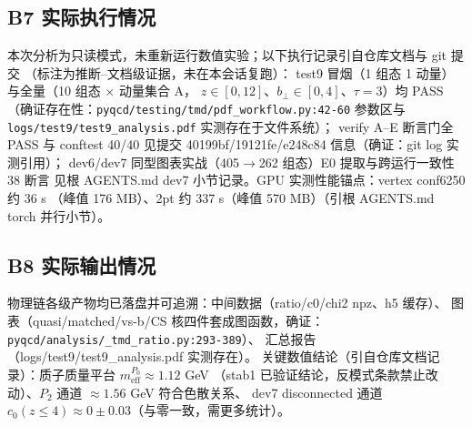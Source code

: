 \documentclass[UTF8]{ctexart}
\begin{document}
\subsection{B7 实际执行情况}
本次分析为只读模式，未重新运行数值实验；以下执行记录引自仓库文档与 git 提交
（标注为\textcolor{relation}{推断--文档级证据}，未在本会话复跑）：
test9 冒烟（1 组态 1 动量）与全量（10 组态 $\times$ 动量集合 A，
$z\in[0,12]$、$b_\perp\in[0,4]$、$\tau=3$）均 PASS
（确证存在性：\texttt{\nolinkurl{pyqcd/testing/tmd/pdf_workflow.py:42-60}}
参数区与 \texttt{logs/test9/test9\_analysis.pdf} 实测存在于文件系统）；
verify A--E 断言门全 PASS 与 conftest 40/40 见提交 40199bf/19121fe/e248c84
信息（确证：git log 实测引用）；
dev6/dev7 同型图表实战（405$\to$262 组态）E0 提取与跨运行一致性 38 断言
见根 AGENTS.md dev7 小节记录。GPU 实测性能锚点：vertex conf6250 约 36 s
（峰值 176 MB）、2pt 约 337 s（峰值 570 MB）（引根 AGENTS.md torch 并行小节）。

\subsection{B8 实际输出情况}
物理链各级产物均已落盘并可追溯：中间数据（ratio/c0/chi2 npz、h5 缓存）、
图表（quasi/matched/vs-b/CS 核四件套成图函数，确证：
\texttt{\nolinkurl{pyqcd/analysis/_tmd_ratio.py:293-389}}）、
汇总报告（logs/test9/test9\_analysis.pdf 实测存在）。
关键数值结论（引自仓库文档记录）：质子质量平台 $m_{\mathrm{eff}}^{P_0}\approx1.12$ GeV
（stab1 已验证结论，反模式条款禁止改动）、$P_2$ 通道 $\approx1.56$ GeV 符合色散关系、
dev7 disconnected 通道 $c_0(z\le4)\approx0\pm0.03$（与零一致，需更多统计）。
\end{document}
